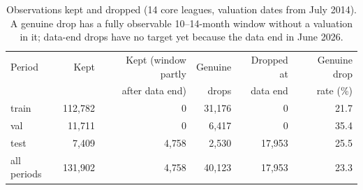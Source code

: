\begin{table}[!h]
\centering
\caption{Observations kept and dropped (14 core leagues, valuation dates from July 2014). A genuine drop has a fully observable 10--14-month window without a valuation in it; data-end drops have no target yet because the data end in June 2026.}
\label{tab:s-dropped}
\footnotesize
\begin{tabular}{lrrrrr}
\toprule
Period & Kept & Kept (window partly & Genuine & Dropped at & Genuine drop \\
 & & after data end) & drops & data end & rate (\%) \\
\midrule
train & 112{,}782 & 0 & 31{,}176 & 0 & 21.7 \\
val & 11{,}711 & 0 & 6{,}417 & 0 & 35.4 \\
test & 7{,}409 & 4{,}758 & 2{,}530 & 17{,}953 & 25.5 \\
all periods & 131{,}902 & 4{,}758 & 40{,}123 & 17{,}953 & 23.3 \\
\bottomrule
\end{tabular}
\end{table}
